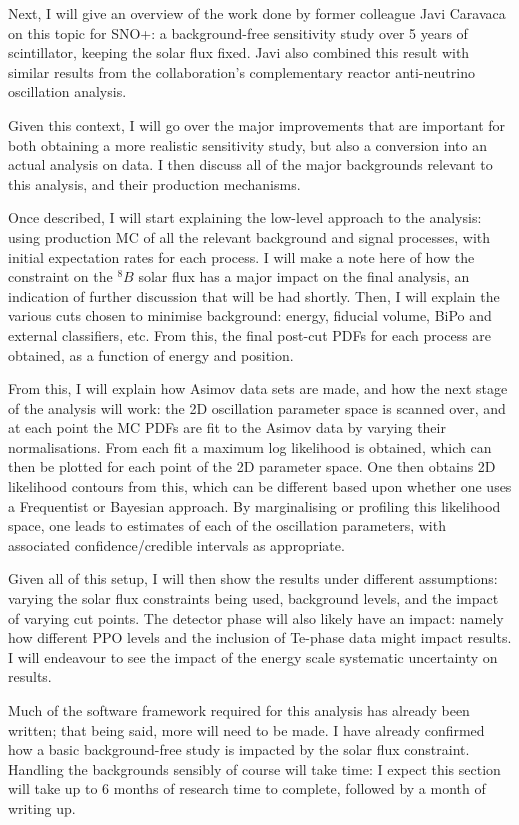 Next, I will give an overview of the work done by former colleague Javi Caravaca on this topic for SNO+: a background-free sensitivity study over 5 years of scintillator, keeping the solar flux fixed. Javi also combined this result with similar results from the collaboration's complementary reactor anti-neutrino oscillation analysis.

Given this context, I will go over the major improvements that are important for both obtaining a more realistic sensitivity study, but also a conversion into an actual analysis on data. I then discuss all of the major backgrounds relevant to this analysis, and their production mechanisms.

Once described, I will start explaining the low-level approach to the analysis: using production MC of all the relevant background and signal processes, with initial expectation rates for each process. I will make a note here of how the constraint on the $^{8}B$ solar flux has a major impact on the final analysis, an indication of further discussion that will be had shortly. Then, I will explain the various cuts chosen to minimise background: energy, fiducial volume, BiPo and external classifiers, etc. From this, the final post-cut PDFs for each process are obtained, as a function of energy and position.

From this, I will explain how Asimov data sets are made, and how the next stage of the analysis will work: the 2D oscillation parameter space is scanned over, and at each point the MC PDFs are fit to the Asimov data by varying their normalisations. From each fit a maximum log likelihood is obtained, which can then be plotted for each point of the 2D parameter space. One then obtains 2D likelihood contours from this, which can be different based upon whether one uses a Frequentist or Bayesian approach. By marginalising or profiling this likelihood space, one leads to estimates of each of the oscillation parameters, with associated confidence/credible intervals as appropriate.

Given all of this setup, I will then show the results under different assumptions: varying the solar flux constraints being used, background levels, and the impact of varying cut points. The detector phase will also likely have an impact: namely how different PPO levels and the inclusion of Te-phase data might impact results. I will endeavour to see the impact of the energy scale systematic uncertainty on results.

Much of the software framework required for this analysis has already been written; that being said, more will need to be made. I have already confirmed how a basic background-free study is impacted by the solar flux constraint. Handling the backgrounds sensibly of course will take time: I expect this section will take up to 6 months of research time to complete, followed by a month of writing up.

